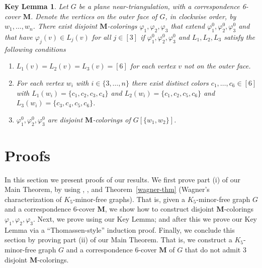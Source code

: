 \documentclass[11pt]{article}
\newtheorem*{keylem}{Key Lemma}
\theoremstyle{definition}
\newcommand\vph{\varphi}
\newcommand\MM{\textbf{M}}
\begin{document}
\begin{keylem}
	Let $G$ be a plane near-triangulation, with a correspondence 6-cover $\MM$.  Denote the vertices 
	on the outer face of $G$, in clockwise order, by $w_1,\ldots,w_n$.  There exist disjoint 
	$\MM$-colorings $\vph_1,\vph_2,\vph_3$ that extend $\vph_1^0,\vph_2^0,\vph_3^0$ and that have 
	$\vph_j(v)\in L_j(v)$ for all $j\in[3]$ if $\vph_1^0,\vph_2^0,\vph_3^0$ and $L_1,L_2,L_3$ 
	satisfy the following conditions
	\begin{enumerate}
		\item[(1)] $L_1(v)=L_2(v)=L_3(v)=[6]$ 
			for each vertex $v$ not on the outer face.
		\item[(2)] For each vertex $w_i$ with $i\in\{3,\ldots,n\}$ there exist distinct colors 
			$c_1,\ldots,c_6\in [6]$ with 
			$L_1(w_i)=\{c_1,c_2,c_3,c_4\}$ and
			$L_2(w_i)=\{c_1,c_2,c_5,c_6\}$ and
			$L_3(w_i)=\{c_3,c_4,c_5,c_6\}$.
		\item[(3)] 
			$\vph_1^0,\vph_2^0,\vph_3^0$ are disjoint $\MM$-colorings of $G[\{w_1,w_2\}]$.
	\end{enumerate}
\end{keylem}

\section{Proofs}

In this section we present proofs of our results.  We first prove part (i) of our Main Theorem, by using 
, , and Theorem~\ref{wagner-thm} (Wagner's characterization of 
$K_5$-minor-free graphs).  That is, given a $K_5$-minor-free graph 
$G$ and a correspondence 6-cover $\MM$, we show how to construct disjoint $\MM$-colorings 
$\vph_1,\vph_2,\vph_3$.  Next, we prove  using our Key Lemma; and after this we prove our 
Key Lemma via a ``Thomassen-style'' induction proof.  Finally, we conclude this section by proving part (ii) 
of our Main Theorem.  That is, we construct a $K_5$-minor-free graph $G$ and a correspondence 6-cover 
$\MM$ of $G$ that do not admit 3 disjoint $\MM$-colorings.
\end{document}
